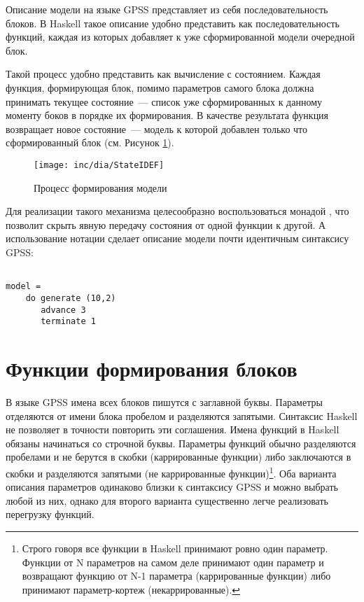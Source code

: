 Описание модели на языке GPSS представляет из себя последовательность блоков. В Haskell такое описание удобно представить как последовательность функций, каждая из которых добавляет к уже сформированной модели очередной блок. 

Такой процесс удобно представить как вычисление с состоянием. Каждая функция, формирующая блок, помимо параметров самого блока должна принимать текущее состояние~--- список уже сформированных к данному моменту боков в порядке их формирования. В качестве результата функция возвращает новое состояние~--- модель к которой добавлен только что сформированный блок (см. Рисунок \ref{fig:StateIDEF}).

\begin{figure}[ht]
  \centering
  \texttt{[image: inc/dia/StateIDEF]}
  \caption{Процесс формирования модели}
  \label{fig:StateIDEF}
\end{figure}

Для реализации такого механизма целесообразно воспользоваться монадой , что позволит скрыть явную передачу состояния от одной функции к другой. А использование нотации  сделает описание модели почти идентичным синтаксису GPSS:

\begin{verbatim}

model = 
    do generate (10,2)
       advance 3
       terminate 1

\end{verbatim}


\section{Функции формирования блоков}

В языке GPSS имена всех блоков пишутся с заглавной буквы. Параметры отделяются от имени блока пробелом и разделяются запятыми. Синтаксис Haskell не позволяет в точности повторить эти соглашения. Имена функций в Haskell обязаны начинаться со строчной буквы. Параметры функций обычно разделяются пробелами и не берутся в скобки (каррированные функции) либо заключаются в скобки и разделяются запятыми (не каррированные функции)\footnote{Строго говоря все функции в Haskell принимают ровно один параметр. Функции от N параметров на самом деле принимают один параметр и возвращают функцию от N-1 параметра (каррированные функции) либо принимают параметр-кортеж (некаррированные).}. Оба варианта описания параметров одинаково близки к синтаксису GPSS и можно выбрать любой из них, однако для второго варианта существенно легче реализовать перегрузку функций.

